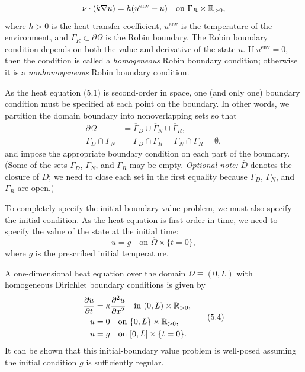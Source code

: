 \begin{enumerate}
    \[\nu \cdot (k \nabla u) = h(u^{\mathrm{env}} - u) \quad \text{on } \Gamma_R \times \mathbb{R}_{>0},\]
    where $h > 0$ is the heat transfer coefficient, $u^{\mathrm{env}}$ is the temperature of the environment, and $\Gamma_R \subset \partial\Omega$ is the Robin boundary. The Robin boundary condition depends on both the value and derivative of the state $u$. If $u^{\mathrm{env}} = 0$, then the condition is called a \textit{homogeneous} Robin boundary condition; otherwise it is a \textit{nonhomogeneous} Robin boundary condition.
\end{enumerate}
As the heat equation (5.1) is second-order in space, one (and only one) boundary condition must be specified at each point on the boundary. In other words, we partition the domain boundary into nonoverlapping sets so that
\begin{align*}
    \partial\Omega &= \overline{\Gamma}_D \cup \overline{\Gamma}_N \cup \overline{\Gamma}_R, \tag{5.2} \\
    \Gamma_D \cap \Gamma_N &= \Gamma_D \cap \Gamma_R = \Gamma_N \cap \Gamma_R = \emptyset, \tag{5.3}
\end{align*}
and impose the appropriate boundary condition on each part of the boundary. (Some of the sets $\Gamma_D$, $\Gamma_N$, and $\Gamma_R$ may be empty. \textit{Optional note:} $\overline{D}$ denotes the closure of $D$; we need to close each set in the first equality because $\Gamma_D$, $\Gamma_N$, and $\Gamma_R$ are open.)

To completely specify the initial-boundary value problem, we must also specify the initial condition. As the heat equation is first order in time, we need to specify the value of the state at the initial time:
\[u = g \quad \text{on } \overline{\Omega} \times \{t = 0\},\]
where $g$ is the prescribed initial temperature.

\begin{example}
    A one-dimensional heat equation over the domain $\Omega \equiv (0, L)$ with homogeneous Dirichlet boundary conditions is given by
    \begin{equation*}
        \begin{aligned}
            \frac{\partial u}{\partial t} &= \kappa \frac{\partial^2 u}{\partial x^2} \quad \text{in } (0, L) \times \mathbb{R}_{>0}, \\
            u &= 0 \quad \text{on } \{0, L\} \times \mathbb{R}_{>0}, \\
            u &= g \quad \text{on } [0, L] \times \{t = 0\}.
        \end{aligned} \tag{5.4}
    \end{equation*}
    It can be shown that this initial-boundary value problem is well-posed assuming the initial condition $g$ is sufficiently regular.
\end{example}

